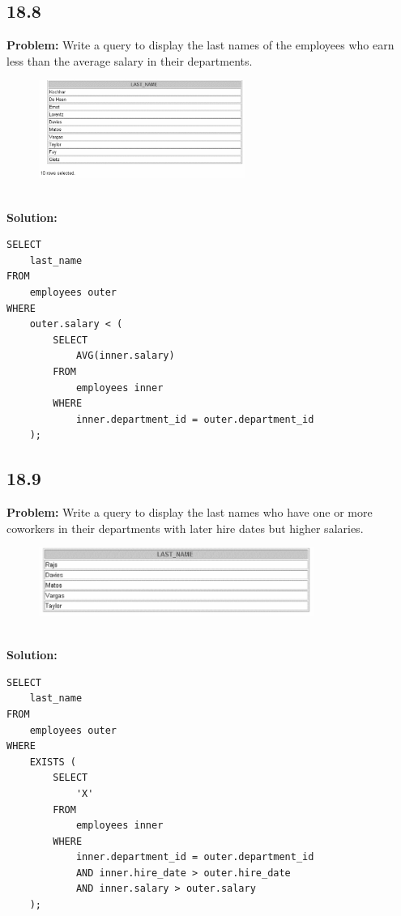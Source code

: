 \documentclass[12pt,a4paper]{article}
\begin{document}
\begin{itemize}
\subsection*{18.8}
\textbf{Problem:} Write a query to display the last names of the employees who earn less than the average salary in their departments.
\\
\begin{figure}[htbp]
  \centering
  \includegraphics[width=0.6\textwidth]{Screenshots/188.png}
\end{figure}\\
\textbf{Solution:}
\begin{lstlisting}
SELECT 
    last_name
FROM
    employees outer
WHERE
    outer.salary < (
        SELECT
            AVG(inner.salary)
        FROM
            employees inner
        WHERE
            inner.department_id = outer.department_id
    );
\end{lstlisting}

\subsection*{18.9}
\textbf{Problem:} Write a query to display the last names who have one or more coworkers in their departments with later hire dates but higher salaries.
\\
\begin{figure}[htbp]
  \centering
  \includegraphics[width=0.8\textwidth]{Screenshots/189.png}
\end{figure}\\
\textbf{Solution:}
\begin{lstlisting}
SELECT 
    last_name
FROM
    employees outer
WHERE
    EXISTS (
        SELECT
            'X'
        FROM
            employees inner
        WHERE
            inner.department_id = outer.department_id
            AND inner.hire_date > outer.hire_date
            AND inner.salary > outer.salary
    );
\end{lstlisting}


\end{itemize}
\end{document}
